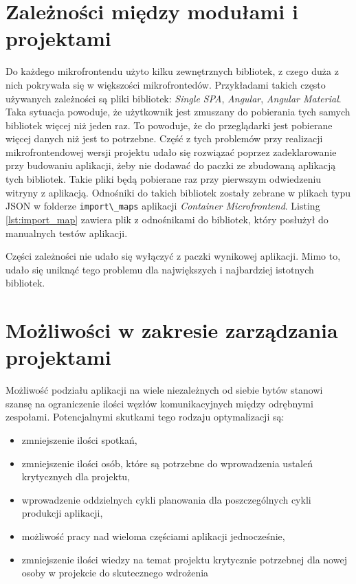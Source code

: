\documentclass{SGGW-thesis}
\begin{document}
{  \section{Zależności między modułami i projektami}
  Do każdego mikrofrontendu użyto kilku zewnętrznych bibliotek, z czego duża z nich pokrywała się w większości mikrofrontedów. Przykładami takich często używanych zależności są pliki bibliotek: \textit{Single SPA}, \textit{Angular}, \textit{Angular Material}. Taka sytuacja powoduje, że użytkownik jest zmuszany do pobierania tych samych bibliotek więcej niż jeden raz. To powoduje, że do przeglądarki jest pobierane więcej danych niż jest to potrzebne. Część z tych problemów przy realizacji mikrofrontendowej wersji projektu udało się rozwiązać poprzez zadeklarowanie przy budowaniu aplikacji, żeby nie dodawać do paczki ze zbudowaną aplikacją tych bibliotek. Takie pliki będą pobierane raz przy pierwszym odwiedzeniu witryny z aplikacją. Odnośniki do takich bibliotek zostały zebrane w plikach typu JSON w folderze \lstinline{import\_maps} aplikacji \textit{Container Microfrontend}. Listing \cref{lst:import_map} zawiera plik z odnośnikami do bibliotek, który posłużył do manualnych testów aplikacji.

  

  Części zależności nie udało się wyłączyć z paczki wynikowej aplikacji. Mimo to, udało się uniknąć tego problemu dla największych i najbardziej istotnych bibliotek.

  \pagebreak

  \section{Możliwości w zakresie zarządzania projektami}
  Możliwość podziału aplikacji na wiele niezależnych od siebie bytów stanowi szansę na ograniczenie ilości węzłów komunikacyjnych między odrębnymi zespołami. Potencjalnymi skutkami tego rodzaju optymalizacji są:

  \begin{itemize}
    \item zmniejszenie ilości spotkań,
    \item zmniejszenie ilości osób, które są potrzebne do wprowadzenia ustaleń krytycznych dla projektu,
    \item wprowadzenie oddzielnych cykli planowania dla poszczególnych cykli produkcji aplikacji,
    \item możliwość pracy nad wieloma częściami aplikacji jednocześnie,
    \item zmniejszenie ilości wiedzy na temat projektu krytycznie potrzebnej dla nowej osoby w projekcie do skutecznego wdrożenia
  \end{itemize}  

}
\end{document}
